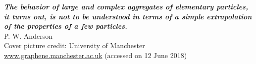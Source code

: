 \thispagestyle{empty}
\hbox{} \vfill
\begin{flushright}
\small \textit{\textbf{The behavior of large and complex aggregates of elementary particles, it turns out, is not to be understood in terms of a simple extrapolation of the properties of a few particles.}}
\\ \vspace{2mm}  
\scriptsize P. W. Anderson
\\ \vspace{10mm}  
Cover picture credit: University of Manchester \\
\url{www.graphene.manchester.ac.uk} (accessed on 12 June 2018)
\end{flushright}

\clearpage
\thispagestyle{empty}
\cleardoublepage